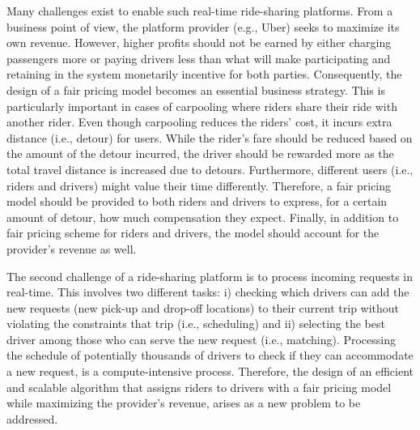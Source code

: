 Many challenges exist to enable such real-time ride-sharing platforms. From a business point of view, the platform provider (e.g., Uber) seeks to maximize its own revenue. However, higher profits should not be earned by either charging passengers more or paying drivers less than what will make participating and retaining in the system monetarily incentive for both parties. Consequently, the design of a fair pricing model becomes an essential business strategy. This is particularly important in cases of carpooling where riders share their ride with another rider. Even though carpooling reduces the riders' cost, it incurs extra distance (i.e., detour) for users. While the rider's fare should be reduced based on the amount of the detour incurred, the driver should be rewarded more as the total travel distance is increased due to detours. Furthermore, different users (i.e., riders and drivers) might value their time differently. Therefore, a fair pricing model should be provided to both riders and drivers to express, for a certain amount of detour, how much compensation they expect. Finally, in addition to fair pricing scheme for riders and drivers, the model should account for the provider's revenue as well.

The second challenge of a ride-sharing platform is to process incoming requests in real-time. This involves two different tasks: i) checking which drivers can add the new requests (new pick-up and drop-off locations) to their current trip without violating the constraints that trip (i.e., scheduling) and ii) selecting the best driver among those who can serve the new request (i.e., matching). Processing the schedule of potentially thousands of drivers to check if they can accommodate a new request, is a compute-intensive process. Therefore, the design of an efficient and scalable algorithm that assigns riders to drivers with a fair pricing model while maximizing the provider's revenue, arises as a new problem to be addressed.


